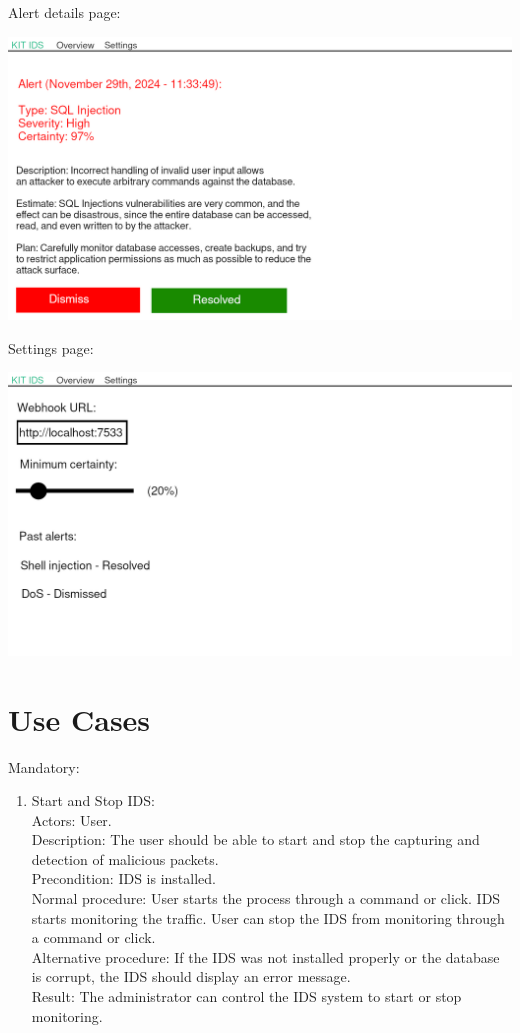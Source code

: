 \documentclass[oneside, english]{reports/assets/sdqtechreport}
\begin{document}
Alert details page:

\includegraphics{ui-details}

Settings page:

\includegraphics{ui-settings}

\chapter{Use Cases}
\label{chap:UseCases}

Mandatory:

\begin{enumerate}
	\item Start and Stop IDS: \\Actors: User. \\Description: The user should be able to start
	      and stop the capturing and detection of malicious packets. \\Precondition: IDS is
	      installed. \\Normal procedure: User starts the process through a command or
	      click. IDS starts monitoring the traffic. User can stop the IDS from monitoring
	      through a command or click. \\Alternative procedure: If the IDS was not installed
	      properly or the database is corrupt, the IDS should display an error message.
	      \\Result: The administrator can control the IDS system to start or stop
	      monitoring.
\end{enumerate}
\end{document}
